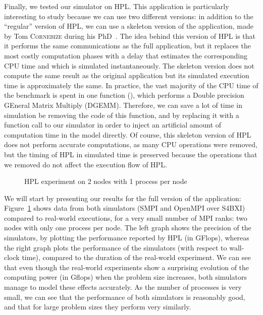 Finally, we tested our simulator on HPL. This application is particularly
interesting to study because we can use two different versions: in addition to
the ``regular'' version of HPL, we can use a skeleton version of the
application, made by Tom \textsc{Cornebize} during his PhD~\cite{Cornebize2021}.
The idea behind this version of HPL is that it performs the same communications
as the full application, but it replaces the most costly computation phases with
a delay that estimates the corresponding CPU time and which is simulated
instantaneously. The skeleton version does not compute the same result as the
original application but its simulated execution time is approximately the same.
In practice, the vast majority of the CPU time of the benchmark is spent in one
function (), which performs a Double precision GEneral Matrix
Multiply (DGEMM). Therefore, we can save a lot of time in simulation be removing
the code of this function, and by replacing it with a function call to our
simulator in order to inject an artificial amount of computation time in the
model directly. Of course, this skeleton version of HPL does not perform
accurate computations, as many CPU operations were removed, but the timing of
HPL in simulated time is preserved because the operations that we removed do not
affect the execution flow of HPL.

\begin{figure}[!ht]
    \centering
    \caption{HPL experiment on 2 nodes with 1 process per node}
    \label{fig:5_high_level:hpl_vanilla_2x1}
\end{figure}

We will start by presenting our results for the full version of the application:
Figure~\ref{fig:5_high_level:hpl_vanilla_2x1} shows data from both simulators
(SMPI and OpenMPI over S4BXI) compared to real-world executions, for a very
small number of MPI ranks: two nodes with only one process per node. The left
graph shows the precision of the simulators, by plotting the performance
reported by HPL (in GFlops), whereas the right graph plots the performance of
the simulators (with respect to wall-clock time), compared to the duration of
the real-world experiment. We can see that even though the real-world
experiments show a surprising evolution of the computing power (in Gflops) when
the problem size increases, both simulators manage to model these effects
accurately. As the number of processes is very small, we can see that the
performance of both simulators is reasonably good, and that for large problem
sizes they perform very similarly.

